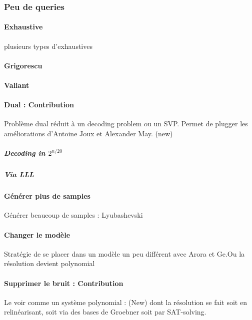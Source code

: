 \documentclass{article}		%
\begin{document}
\subsubsection{Peu de queries}
\paragraph{Exhaustive}
plusieurs types d'exhaustives \cite{Gol}
\paragraph{Grigorescu} \cite{Indyk} \cite{Grigo}
\paragraph{Valiant} \cite{Valiant}
\paragraph{Dual : Contribution } Problème dual réduit à  un decoding
problem ou un SVP. Permet de plugger les améliorations d'Antoine Joux et Alexander May. (new)
\subparagraph{Decoding in $2^{n/20}$} \cite{Stern}
\subparagraph{Via LLL}
\paragraph{Générer plus de samples} Générer beaucoup de samples :
Lyubashevski \cite{Vadim}
\paragraph{Changer le modèle} \cite{Arora} Stratégie de se placer dans un modèle un peu différent avec Arora et Ge.Ou la résolution devient polynomial 
\paragraph{Supprimer le bruit : Contribution}\label{SAT}
Le voir comme un système polynomial : (New) dont la résolution se fait
soit en relinéarisant, soit via des bases de Groebner soit par
SAT-solving. 
\end{document}
